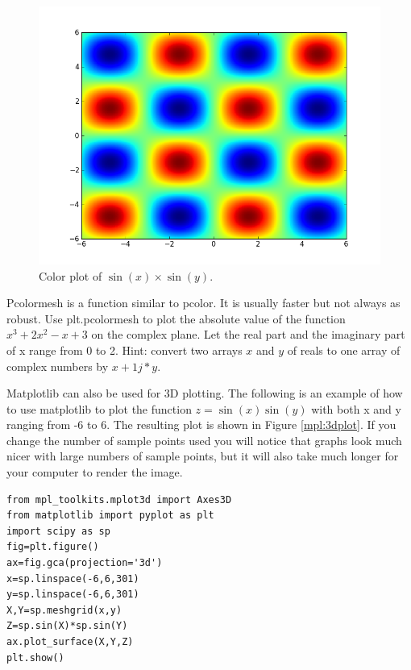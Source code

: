 \begin{figure}
\includegraphics[width=\textwidth]{pcolor.png}
\caption{Color plot of $\sin\left(x\right)\times\sin\left(y\right)$.}
\label{mpl:pcolor}
\end{figure}

\begin{problem}
Pcolormesh is a function similar to pcolor. It is usually faster but not always as robust.
Use plt.pcolormesh to plot the absolute value of the function $x^3 +2x^2 -x +3$ on the complex plane.
Let the real part and the imaginary part of x range from 0 to 2. Hint: convert two arrays $x$ and $y$ of reals to one array of complex numbers by $x + 1j*y$.
\end{problem}

Matplotlib can also be used for 3D plotting.
The following is an example of how to use matplotlib to plot the function $z=\sin(x)\sin(y)$ with both x and y ranging from -6 to 6.
The resulting plot is shown in Figure \ref{mpl:3dplot}.
If you change the number of sample points used you will notice that graphs look much nicer with large numbers of sample points, but it will also take much longer for your computer to render the image.

\begin{lstlisting}
from mpl_toolkits.mplot3d import Axes3D
from matplotlib import pyplot as plt
import scipy as sp
fig=plt.figure()
ax=fig.gca(projection='3d')
x=sp.linspace(-6,6,301)
y=sp.linspace(-6,6,301)
X,Y=sp.meshgrid(x,y)
Z=sp.sin(X)*sp.sin(Y)
ax.plot_surface(X,Y,Z)
plt.show()
\end{lstlisting}

